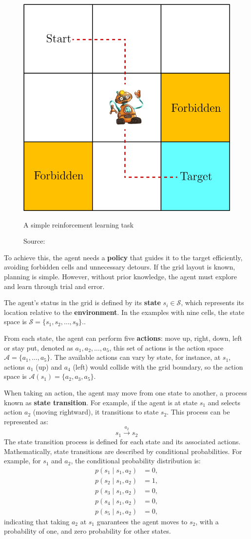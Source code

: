 \begin{figure}[h]
    \centering
    \includegraphics[width=.42\textwidth]{figures/ch3/2.rl.png}
    \caption{A simple reinforcement learning task}
    \vspace{-10px}
    \caption*{\scriptsize{Source: \cite{zhao2024RLBook}}}
    \label{fig:rl}
\end{figure}

To achieve this, the agent needs a \textbf{policy} that guides it to the target
efficiently, avoiding forbidden cells and unnecessary detours.
If the grid layout is known, planning is simple.
However, without prior knowledge, the agent must explore and learn
through trial and error.

The agent's status in the grid is defined by its \textbf{state}
\( s_i \in \mathcal{S} \), which represents its location relative
to the \textbf{environment}.
In the examples with nine cells, the state space is
\( \mathcal{S} = \{s_1, s_2, \ldots, s_9\} \)..

From each state, the agent can perform five \textbf{actions}: move up,
right, down, left or stay put, denoted as \( a_1, a_2, \ldots, a_5 \),
this set of actions is the action space
\( \mathcal{A} = \{a_1, \ldots, a_5\} \).
The available actions can vary by state, for instance,
at \( s_1 \), actions \( a_1 \) (up) and \( a_4 \) (left) would collide
with the grid boundary, so the action space is
\( \mathcal{A}(s_1) = \{a_2, a_3, a_5\} \).

When taking an action, the agent may move from one state to another,
a process known as \textbf{state transition}. For example,
if the agent is at state \( s_1 \) and selects action
\( a_2 \) (moving rightward), it transitions to state
\( s_2 \). This process can be represented as:
\[ s_1 \overset{a_2}{\longrightarrow} s_2 \]
The state transition process is defined for each
state and its associated actions. Mathematically, state transitions
are described by conditional probabilities.
For example, for \( s_1 \) and \( a_2 \),
the conditional probability distribution is:
\[
\begin{aligned}
p(s_1 \mid s_1, a_2) &= 0, \\
p(s_2 \mid s_1, a_2) &= 1, \\
p(s_3 \mid s_1, a_2) &= 0, \\
p(s_4 \mid s_1, a_2) &= 0, \\
p(s_5 \mid s_1, a_2) &= 0,
\end{aligned}
\]
indicating that taking \( a_2 \) at \( s_1 \) guarantees
the agent moves to \( s_2 \), with a probability of one,
and zero probability for other states.

